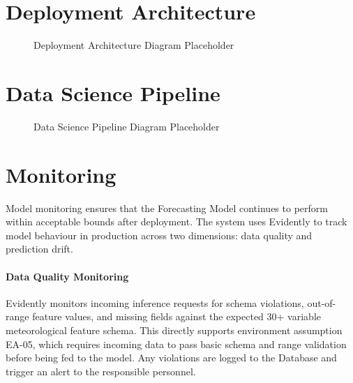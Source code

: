 \documentclass[12pt, a4paper]{report}
\begin{document}
\section{Deployment Architecture}

\lipsum[12][1-4]

\begin{figure}[H]
    \centering
    \fbox{\rule{0pt}{5cm}\rule{0.75\textwidth}{0pt}}
    \caption{Deployment Architecture Diagram Placeholder}
    \label{fig:deployment-arch}
\end{figure}

\lipsum[13][1-2]

\section{Data Science Pipeline}

\lipsum[14][1-4]

\begin{figure}[H]
    \centering
    \fbox{\rule{0pt}{4cm}\rule{0.75\textwidth}{0pt}}
    \caption{Data Science Pipeline Diagram Placeholder}
    \label{fig:ds-pipeline}
\end{figure}

\lipsum[15][1-2]

\section{Monitoring}

Model monitoring ensures that the Forecasting Model continues to perform within acceptable bounds after deployment. The system uses Evidently to track model behaviour in production across two dimensions: data quality and prediction drift.

\paragraph{Data Quality Monitoring}

Evidently monitors incoming inference requests for schema violations, out-of-range feature values, and missing fields against the expected 30+ variable meteorological feature schema. This directly supports environment assumption EA-05, which requires incoming data to pass basic schema and range validation before being fed to the model. Any violations are logged to the Database and trigger an alert to the 
responsible personnel.
\end{document}
